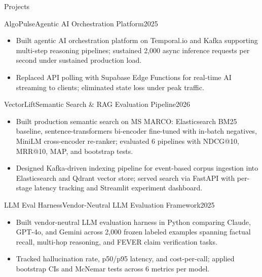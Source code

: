\documentclass[]{mcdowellcv}
\begin{document}
\begin{cvsection}{Projects}
  \begin{cvsubsection}{AlgoPulse}{Agentic AI Orchestration Platform}{2025}
    \begin{itemize}
      \item Built agentic AI orchestration platform on Temporal.io and Kafka supporting multi-step reasoning pipelines; sustained 2,000 async inference requests per second under sustained production load.
      \item Replaced API polling with Supabase Edge Functions for real-time AI streaming to clients; eliminated state loss under peak traffic.
    \end{itemize}
    \vspace{-1.5pt}
  \end{cvsubsection}

  \begin{cvsubsection}{VectorLift}{Semantic Search \& RAG Evaluation Pipeline}{2026}
    \begin{itemize}
      \item Built production semantic search on MS MARCO: Elasticsearch BM25 baseline, sentence-transformers bi-encoder fine-tuned with in-batch negatives, MiniLM cross-encoder re-ranker; evaluated 6 pipelines with NDCG@10, MRR@10, MAP, and bootstrap tests.
      \item Designed Kafka-driven indexing pipeline for event-based corpus ingestion into Elasticsearch and Qdrant vector store; served search via FastAPI with per-stage latency tracking and Streamlit experiment dashboard.
    \end{itemize}
    \vspace{-1.5pt}
  \end{cvsubsection}

  \begin{cvsubsection}{LLM Eval Harness}{Vendor-Neutral LLM Evaluation Framework}{2025}
    \begin{itemize}
      \item Built vendor-neutral LLM evaluation harness in Python comparing Claude, GPT-4o, and Gemini across 2,000 frozen labeled examples spanning factual recall, multi-hop reasoning, and FEVER claim verification tasks.
      \item Tracked hallucination rate, p50/p95 latency, and cost-per-call; applied bootstrap CIs and McNemar tests across 6 metrics per model.
    \end{itemize}
  \end{cvsubsection}
\end{cvsection}
\end{document}
